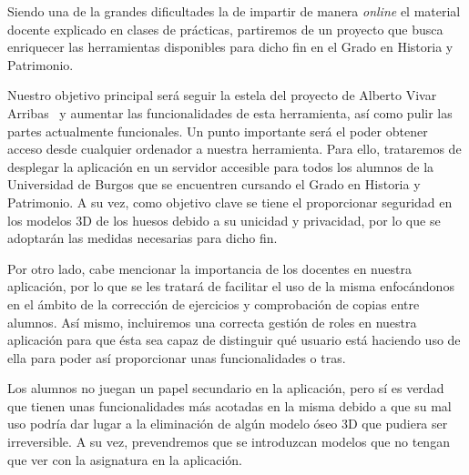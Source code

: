 
Siendo una de la grandes dificultades la de impartir de manera \textit{online} el material docente explicado en clases de prácticas, partiremos de un proyecto que busca enriquecer las herramientas disponibles para dicho fin en el Grado en Historia y Patrimonio.

Nuestro objetivo principal será seguir la estela del proyecto de Alberto Vivar Arribas~\cite{github:alberto-viewer} y aumentar las funcionalidades de esta herramienta, así como pulir las partes actualmente funcionales. Un punto importante será el poder obtener acceso desde cualquier ordenador a nuestra herramienta. Para ello, trataremos de desplegar la aplicación en un servidor accesible para todos los alumnos de la Universidad de Burgos que se encuentren cursando el Grado en Historia y Patrimonio. A su vez, como objetivo clave se tiene el proporcionar seguridad en los modelos 3D de los huesos debido a su unicidad y privacidad, por lo que se adoptarán las medidas necesarias para dicho fin.

Por otro lado, cabe mencionar la importancia de los docentes en nuestra aplicación, por lo que se les tratará de facilitar el uso de la misma enfocándonos en el ámbito de la corrección de ejercicios y comprobación de copias entre alumnos. Así mismo, incluiremos una correcta gestión de roles en nuestra aplicación para que ésta sea capaz de distinguir qué usuario está haciendo uso de ella para poder así proporcionar unas funcionalidades o tras.

Los alumnos no juegan un papel secundario en la aplicación, pero sí es verdad que tienen unas funcionalidades más acotadas en la misma debido a que su mal uso podría dar lugar a la eliminación de algún modelo óseo 3D que pudiera ser irreversible. A su vez, prevendremos que se introduzcan modelos que no tengan que ver con la asignatura en la aplicación.
